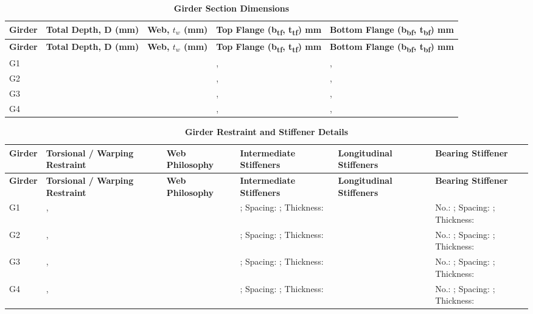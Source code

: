 \documentclass[12pt,a4paper]{report}
\numberwithin{table}{chapter}
\numberwithin{figure}{chapter}
\newcommand{\ReportMinorGap}{\vspace{0.4em}}
\begin{document}
\ReportMinorGap
\begin{longtable}{|L{1.8cm}|L{2.3cm}|L{1.8cm}|p{4.8cm}|p{4.8cm}|}
\caption{\textbf{Girder Section Dimensions}}\\
\hline
\textbf{Girder} & \textbf{Total Depth, D (mm)} & \textbf{Web, $t_w$ (mm)} & \textbf{Top Flange (b\textsubscript{tf}, t\textsubscript{tf}) mm} & \textbf{Bottom Flange (b\textsubscript{bf}, t\textsubscript{bf}) mm} \\[6pt]
\hline
\endfirsthead
\hline
\textbf{Girder} & \textbf{Total Depth, D (mm)} & \textbf{Web, $t_w$ (mm)} & \textbf{Top Flange (b\textsubscript{tf}, t\textsubscript{tf}) mm} & \textbf{Bottom Flange (b\textsubscript{bf}, t\textsubscript{bf}) mm} \\[6pt]
\hline
\endhead

G1 &  &  & ,  & ,  \\[8pt]
\hline
G2 &  &  & ,  & ,  \\[8pt]
\hline
G3 &  &  & ,  & ,  \\[8pt]
\hline
G4 &  &  & ,  & ,  \\[8pt]
\hline
\end{longtable}

\ReportMinorGap

\ReportMinorGap
\begin{longtable}{|L{1.4cm}|p{2.2cm}|p{2.2cm}|p{3.0cm}|p{2.4cm}|p{2.2cm}|}
\caption{\textbf{Girder Restraint and Stiffener Details}}\\
\hline
\textbf{Girder} & \textbf{Torsional / Warping Restraint} & \textbf{Web Philosophy} & \textbf{Intermediate Stiffeners} & \textbf{Longi\-tudinal Stiffeners} & \textbf{Bearing Stiffener} \\[6pt]
\hline
\endfirsthead
\hline
\textbf{Girder} & \textbf{Torsional / Warping Restraint} & \textbf{Web Philosophy} & \textbf{Intermediate Stiffeners} & \textbf{Longi\-tudinal Stiffeners} & \textbf{Bearing Stiffener} \\[6pt]
\hline
\endhead



G1 & ,  &  & ; Spacing: ; Thickness:  &  & No.: ; Spacing: ; Thickness:  \\[8pt]
\hline
G2 & ,  &  & ; Spacing: ; Thickness:  &  & No.: ; Spacing: ; Thickness:  \\[8pt]
\hline
G3 & ,  &  & ; Spacing: ; Thickness:  &  & No.: ; Spacing: ; Thickness:  \\[8pt]
\hline
G4 & ,  &  & ; Spacing: ; Thickness:  &  & No.: ; Spacing: ; Thickness:  \\[8pt]
\hline
\end{longtable}
\end{document}
